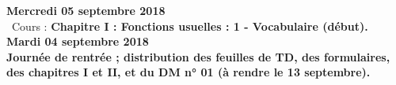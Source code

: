 \documentclass[12pt,a4paper]{article}
\begin{document}
\noindent\textbf{\bf Mercredi 05 septembre 2018}\\
\bu\ Cours : \bf Chapitre I \rm : Fonctions usuelles : 1 - Vocabulaire (début).\vspace{.4cm}\\
 
\noindent\textbf{\bf Mardi 04 septembre 2018}\\
Journée de rentrée ; distribution des feuilles de TD, des formulaires, des
chapitres I et II, et du DM n° 01 (à rendre le 13 septembre).\vspace{.4cm}\\


\label{end}
\end{document}
